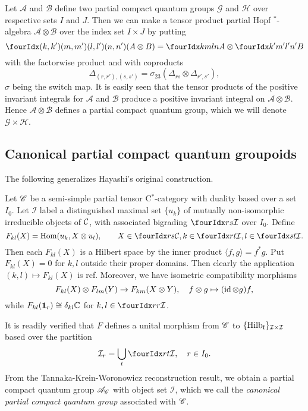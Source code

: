 
\begin{Exa} Let $\mathscr{A}$ and $\mathscr{B}$ define two partial compact quantum groups $\mathscr{G}$ and $\mathscr{H}$ over respective sets $I$ and $J$. Then we can make a tensor product partial Hopf $^*$-algebra $\mathscr{A}\otimes \mathscr{B}$ over the index set $I\times J$ by putting \[\Gr{(A\otimes B)}{(k,k')}{(l,l')}{(m,m')}{(n,n')} = \Gr{A}{k}{l}{m}{n}\otimes \Gr{B}{k'}{l'}{m'}{n'}\] with the factorwise product and with coproducts \[\Delta_{(r,r'),(s,s')} = \sigma_{23}(\Delta_{rs}\otimes \Delta_{r',s'}),\] $\sigma$ being the switch map. It is easily seen that the tensor products of the positive invariant integrals for $\mathscr{A}$ and $\mathscr{B}$ produce a positive invariant integral on $\mathscr{A}\otimes \mathscr{B}$. Hence $\mathscr{A}\otimes \mathscr{B}$ defines a partial compact quantum group, which we will denote $\mathscr{G}\times \mathscr{H}$.
\end{Exa}

\subsection{Canonical partial compact quantum groupoids}

The following generalizes Hayashi's original construction.

\begin{Exa} 
Let $\mathscr{C}$ be a semi-simple partial tensor C$^*$-category with duality based over a set $I_0$. Let $\mathcal{I}$ label a distinguished maximal set $\{u_k\}$ of mutually non-isomorphic irreducible objects of $\mathcal{C}$, with associated bigrading $\Gru{\mathcal{I}}{r}{s}$ over $I_0$. Define \[F_{kl}(X)  = \Hom(u_k,  X\otimes u_l),\qquad X\in \Gru{\CatC}{r}{s}, k\in \Gru{\mathcal{I}}{r}{t},l\in \Gru{\mathcal{I}}{s}{t}.\] Then each $F_{kl}(X)$ is a Hilbert space by the inner product $\langle f,g\rangle = f^*g$. Put $F_{kl}(X) = 0$ for $k,l$ outside their proper domains. Then clearly the application $(k,l)\mapsto F_{kl}(X)$ is rcf. Moreover, we have isometric compatibility morphisms \[F_{kl}(X)\otimes F_{lm}(Y)\rightarrow F_{km}(X\otimes Y),\quad f\otimes g \mapsto (\operatorname{id}\otimes g)f,\] while $F_{kl}(\mathbf{1}_r) \cong \delta_{kl} \mathbb{C}$ for $k,l\in \Gru{\mathcal{I}}{r}{r}$. 

It is readily verified that $F$ defines a unital morphism from $\mathscr{C}$ to $\{\mathrm{Hilb}_{\operatorname{\mathrm{f}}}\}_{\mathcal{I}\times \mathcal{I}}$ based over the partition \[\mathcal{I}_r = \bigcup_{t} \Gru{\mathcal{I}}{r}{t},\quad r\in I_0.\] From the Tannaka-Krein-Woronowicz reconstruction result, we obtain a partial compact quantum group $\mathscr{A}_{\mathscr{C}}$ with object set $\mathcal{I}$, which we call the \emph{canonical partial compact quantum group} associated with $\mathscr{C}$. 
\end{Exa} 

